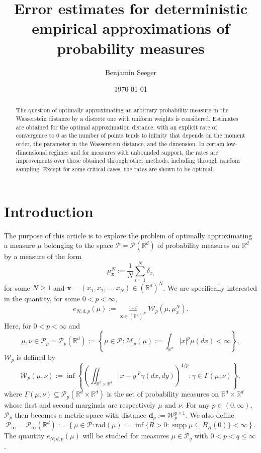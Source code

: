 \documentclass[11pt,reqno]{amsart}
\title
[Error estimates for deterministic empirical approximations of prob. meas.]
{Error estimates for deterministic empirical approximations of probability measures}
\author{Benjamin Seeger}
\date{\today}
\newcommand{\bx}{{\bm{x}}}
\newcommand{\rad}{\mathrm{rad}}
\theoremstyle{definition}
\def\bx{{\boldsymbol x}}
\newcommand{\bm}[1]{\boldsymbol #1}
\newcommand{\Rd}{{\mathbb{R}^d}}
\DeclareMathOperator{\supp}{supp}
\newcommand{\RR}{{\mathbb R}}
\newcommand{\mcl}{\mathcal}
\newcommand{\mbf}{\mathbf}
\theoremstyle{definition}
\numberwithin{equation}{section}
\numberwithin{lemma}{section}
\numberwithin{proposition}{section}
\numberwithin{theorem}{section}
\numberwithin{corollary}{section}
\numberwithin{definition}{section}
\numberwithin{remark}{section}
\begin{document}
\maketitle

\begin{abstract}
	The question of optimally approximating an arbitrary probability measure in the Wasserstein distance by a discrete one with uniform weights is considered. Estimates are obtained for the optimal approximation distance, with an explicit rate of convergence to $0$ as the number of points tends to infinity that depends on the moment order, the parameter in the Wasserstein distance, and the  dimension. In certain low-dimensional regimes and for measures with unbounded support, the rates are improvements over those obtained through other methods, including through random sampling. Except for some critical cases, the rates are shown to be optimal.
\end{abstract}

\section{Introduction}





The purpose of this article is to explore the problem of optimally approximating a measure $\mu$ belonging to the space $\mcl P = \mcl P(\Rd)$ of probability measures on $\RR^d$ by a measure of the form
\begin{equation}\label{empirical}
	\mu^N_\bx := \frac{1}{N} \sum_{i=1}^N \delta_{x_i}
\end{equation}
for some $N \ge 1$ and $\bx = (x_1,x_2,\ldots, x_N) \in (\Rd)^N$. We are specifically interested in the quantity, for some $0 < p < \infty$,
\begin{equation}\label{error}
	e_{N;d,p}(\mu) := \inf_{\bx \in (\Rd)^N} \mcl W_p (\mu, \mu^N_x) .
\end{equation}
Here, for $0 < p < \infty$ and
\[
	\mu, \nu \in \mcl P_p = \mcl P_p(\Rd) := \left\{ \mu \in \mcl P : \mcl M_p(\mu) := \int_\Rd |x|^p \mu(dx) < \infty \right\},
\]
$\mcl W_p$ is defined by
\begin{equation}\label{Wasserstein}
	\mcl W_p(\mu,\nu) := \inf \left\{ \left( \iint_{\Rd \times \Rd} |x-y|^p \gamma(dx,dy) \right)^{1/p}: \gamma \in \Gamma(\mu,\nu) \right\},
\end{equation}
where $\Gamma(\mu,\nu) \subseteq \mcl P_p(\Rd \times \Rd)$ is the set of probability measures on $\Rd \times \Rd$ whose first and second marginals are respectively $\mu$ and $\nu$. For any $p \in (0, \infty)$, $\mcl P_p$ then becomes a metric space with distance $\mbf d_p := \mcl W_p^{p \wedge 1}$. We also define
\[
    \mcl P_\infty = \mcl P_\infty(\Rd) := \left\{ \mu \in \mcl P : \rad(\mu) := \inf\{R > 0 : \supp \mu \subseteq B_R(0) \} < \infty \right\}.
\]
The quantity $e_{N;d,p}(\mu)$ will be studied for measures $\mu \in \mcl P_q$ with $0 < p < q \le \infty$.
\end{document}
